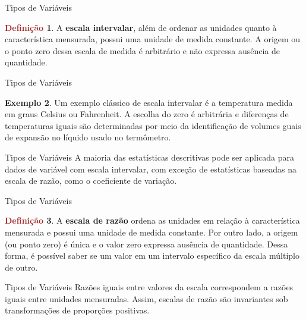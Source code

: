 \documentclass[10pt]{beamer}
\renewcommand{\indent}{\hspace*{2em}}
\theoremstyle{definition}
\newtheorem{defn}{\textcolor{brown}{Definição}}[section]
\newtheorem{ex}[defn]{\textcolor{strpink}{Exemplo}}
\begin{document}
\begin{frame}{Tipos de Variáveis}
\begin{defn}
\vfill\indent A \textbf{escala intervalar}, além de ordenar as unidades quanto à característica mensurada, possui uma unidade de medida constante. A origem ou o ponto zero dessa escala de medida é arbitrário e não expressa ausência de quantidade.
\end{defn}
\end{frame}

\begin{frame}{Tipos de Variáveis}
\begin{ex}
\vfill\indent Um exemplo clássico de escala intervalar é a temperatura medida em graus Celsius ou Fahrenheit. A escolha do zero é arbitrária e diferenças de temperaturas iguais são determinadas por meio da identificação de volumes guais de expansão no líquido usado no termômetro.
\end{ex}
\end{frame}

\begin{frame}{Tipos de Variáveis}
\indent A maioria das estatísticas descritivas pode ser aplicada para dados de variável com escala intervalar, com exceção de estatísticas baseadas na escala de razão, como o coeficiente de variação.
\end{frame}

\begin{frame}{Tipos de Variáveis}
\begin{defn}
\vfill\indent A \textbf{escala de razão} ordena as unidades em relação à característica mensurada e possui uma unidade de medida constante. Por outro lado, a origem (ou ponto zero) é única e o valor zero expressa ausência de quantidade. Dessa forma, é possível saber se um valor em um intervalo específico da escala múltiplo de outro.
\end{defn}
\end{frame}

\begin{frame}{Tipos de Variáveis}
\indent Razões iguais entre valores da escala correspondem a razões iguais entre unidades mensuradas. Assim, escalas de razão são invariantes sob transformações de proporções positivas.
\end{frame}
\end{document}
